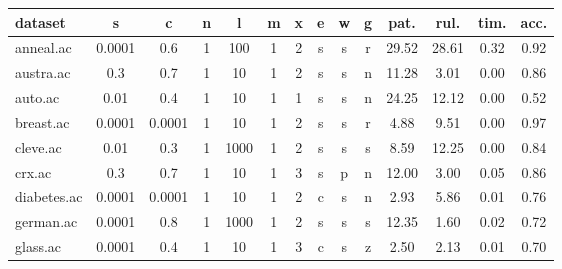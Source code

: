 \begin{table}[htbp]
	\centering
		\begin{tabular}{|l|c|c|c|c|c|c|c|c|c||c|c|c|c|}
		\hline
		\textbf{dataset}	& \textbf{s}	& \textbf{c}	& \textbf{n}	& \textbf{l}	& \textbf{m}	& \textbf{x}	& \textbf{e} & \textbf{w} & \textbf{g} & \textbf{pat.}	& \textbf{rul.}	& \textbf{tim.}	& \textbf{acc.}	\\
		\hline
		anneal.ac      & 0.0001   & 0.6         & 1              & 100                 & 1             & 2             & s      & s        & r        & 29.52          & 28.61          & 0.32           & 0.92           \\
		\hline
		austra.ac      & 0.3      & 0.7         & 1              & 10                  & 1             & 2             & s      & s        & n        & 11.28          & 3.01           & 0.00           & 0.86           \\
		\hline
		auto.ac        & 0.01     & 0.4         & 1              & 10                  & 1             & 1             & s      & s        & n        & 24.25          & 12.12          & 0.00           & 0.52           \\
		\hline
		breast.ac      & 0.0001   & 0.0001      & 1              & 10                  & 1             & 2             & s      & s        & r        & 4.88           & 9.51           & 0.00           & 0.97           \\
		\hline
		cleve.ac       & 0.01     & 0.3         & 1              & 1000                & 1             & 2             & s      & s        & s        & 8.59           & 12.25          & 0.00           & 0.84           \\
		\hline
		crx.ac         & 0.3      & 0.7         & 1              & 10                  & 1             & 3             & s      & p        & n        & 12.00          & 3.00           & 0.05           & 0.86           \\
		\hline
		diabetes.ac    & 0.0001   & 0.0001      & 1              & 10                  & 1             & 2             & c      & s        & n        & 2.93           & 5.86           & 0.01           & 0.76           \\
		\hline
		german.ac      & 0.0001   & 0.8         & 1              & 1000                & 1             & 2             & s      & s        & s        & 12.35          & 1.60           & 0.02           & 0.72           \\
		\hline
		glass.ac       & 0.0001   & 0.4         & 1              & 10                  & 1             & 3             & c      & s        & z        & 2.50           & 2.13           & 0.01           & 0.70           \\

\end{tabular}
\end{table}

